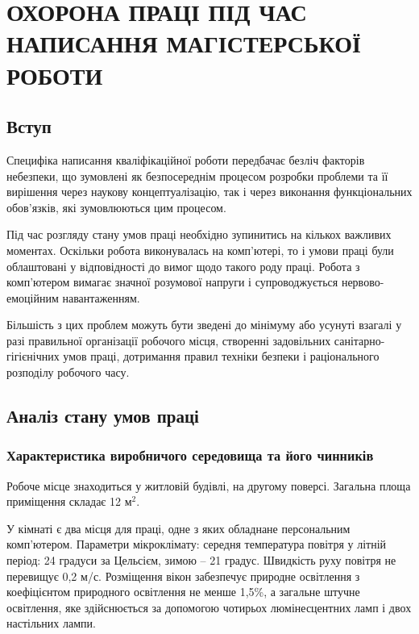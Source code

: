 
\section{ОХОРОНА ПРАЦІ ПІД ЧАС НАПИСАННЯ МАГІСТЕРСЬКОЇ РОБОТИ}

\subsection{Вступ}

Специфіка написання кваліфікаційної роботи передбачає безліч факторів небезпеки, що зумовлені як безпосереднім процесом розробки проблеми та її вирішення через наукову концептуалізацію, так і через виконання функціональних обов’язків, які зумовлюються цим процесом.

Під час розгляду стану умов праці необхідно зупинитись на кількох важливих моментах. Оскільки робота виконувалась на комп’ютері, то і умови праці були облаштовані у відповідності до вимог щодо такого роду праці. Робота з комп'ютером вимагає значної розумової напруги і супроводжується нервово-емоційним навантаженням.

Більшість з цих проблем можуть бути зведені до мінімуму або усунуті взагалі у разі правильної організації робочого місця, створенні задовільних санітарно-гігієнічних умов праці, дотримання правил техніки безпеки і раціонального розподілу робочого часу.

\subsection{Аналіз стану умов праці}

\subsubsection{Характеристика виробничого середовища та його чинників}

Робоче  місце знаходиться у житловій будівлі, на другому поверсі. Загальна площа приміщення складає 12 $\text{м}^2$.

У кімнаті є два місця для праці, одне з яких обладнане персональним комп’ютером.
Параметри мікроклімату: середня температура повітря у літній період: 24 градуси за Цельсієм, зимою – 21 градус. Швидкість руху повітря не перевищує
 0,2 м/с. Розміщення вікон забезпечує природне освітлення з коефіцієнтом природного освітлення не менше 1,5\%, а загальне штучне освітлення, яке здійснюється за допомогою чотирьох люмінесцентних ламп і двох настільних лампи.

